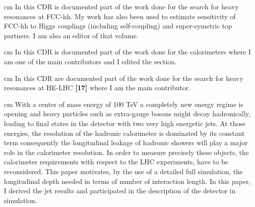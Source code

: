 \documentclass[12pt]{article}
\begin{document}
 cm
\noindent {\bf \color{red} [12]} In this CDR is documented part of the work done for the search for heavy resonances at FCC-hh. My work has also been used to estimate sensitivity of FCC-hh to Higgs couplings (including self-coupling) and super-symetric top partners. I am also an editor of that volume.

 cm
\noindent {\bf \color{red} [13]} In this CDR is documented part of the work done for the calorimeters where I am one of the main contributors and I edited the section. 

 cm
\noindent {\bf \color{red} [14]} In this CDR are documented part of the work done for the search for heavy resonances at HE-LHC {\bf \color{red} [17]} where I am the main contributor.

 cm
\noindent {\bf \color{red} [15]} With a center of mass energy of 100 TeV a completely new energy regime is opening and heavy particles such as extra-gauge bosons might decay hadronically, leading to final states in the detector with two very high energetic jets. At those energies, the resolution of the hadronic calorimeter is dominated by its constant term consequently the longitudinal leakage of  hadronic showers will play a major role in the calorimeter resolution. In order to measure precisely these objects, the calorimeter requirements with respect to the LHC experiments, have to be reconsidered. This paper motivates, by the use of a detailed full simulation, the longitudinal depth needed in terms of number of interaction length. In this paper, I derived the jet results and participated in the description of the detector in simulation.
\end{document}
